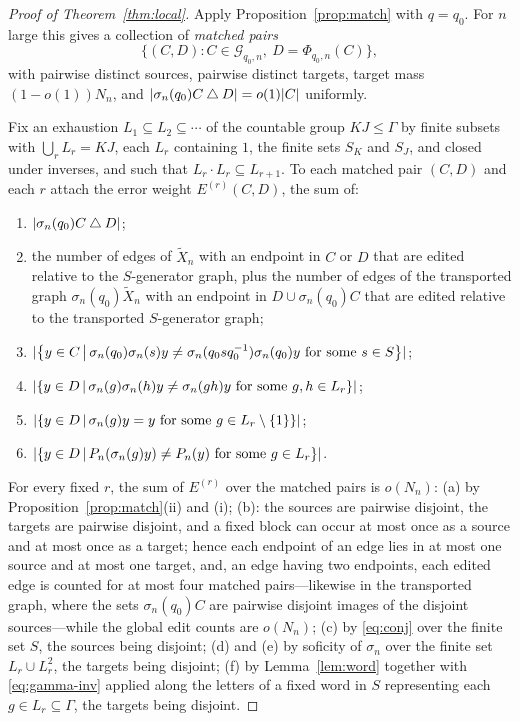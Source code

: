 \documentclass[11pt]{amsart}
\theoremstyle{definition}
\theoremstyle{plain}
\newcommand{\cG}{\mathcal G}
\DeclarePairedDelimiter{\abs}{\lvert}{\rvert}
\newcommand{\set}[1]{\left\{#1\right\}}
\newcommand{\suchthat}{\,\middle|\,}
\newcommand{\symdiff}{\mathbin{\triangle}}
\begin{document}
\begin{proof}[Proof of Theorem~\ref{thm:local}]
Apply Proposition~\ref{prop:match} with \(q=q_0\).  For \(n\) large this gives a collection of \emph{matched pairs}
\begin{equation}\label{eq:pairs}
 \bigl\{(C,D):C\in\cG_{q_0,n},\ D=\Phi_{q_0,n}(C)\bigr\},
\end{equation}
with pairwise distinct sources, pairwise distinct targets, target mass \((1-o(1))N_n\), and \(\abs{\sigma_n(q_0)C\symdiff D}=o(1)\abs C\) uniformly.

Fix an exhaustion \(L_1\subseteq L_2\subseteq\cdots\) of the countable group \(KJ\leq\Gamma\) by finite subsets with \(\bigcup_rL_r=KJ\), each \(L_r\) containing \(1\), the finite sets \(S_K\) and \(S_J\), and closed under inverses, and such that \(L_r\cdot L_r\subseteq L_{r+1}\).  To each matched pair \((C,D)\) and each \(r\) attach the error weight \(E^{(r)}(C,D)\), the sum of:
\begin{enumerate}[label=\textup{(\alph*)}]
\item \(\abs{\sigma_n(q_0)C\symdiff D}\);
\item the number of edges of \(\widetilde X_n\) with an endpoint in \(C\) or \(D\) that are edited relative to the \(S\)-generator graph, plus the number of edges of the transported graph \(\sigma_n(q_0)\widetilde X_n\) with an endpoint in \(D\cup\sigma_n(q_0)C\) that are edited relative to the transported \(S\)-generator graph;
\item \(\abs{\set{y\in C\suchthat\sigma_n(q_0)\sigma_n(s)y\ne\sigma_n(q_0sq_0^{-1})\sigma_n(q_0)y\text{ for some }s\in S}}\);
\item \(\abs{\set{y\in D\suchthat\sigma_n(g)\sigma_n(h)y\ne\sigma_n(gh)y\text{ for some }g,h\in L_r}}\);
\item \(\abs{\set{y\in D\suchthat\sigma_n(g)y=y\text{ for some }g\in L_r\setminus\{1\}}}\);
\item \(\abs{\set{y\in D\suchthat P_n(\sigma_n(g)y)\ne P_n(y)\text{ for some }g\in L_r}}\).
\end{enumerate}
For every fixed \(r\), the sum of \(E^{(r)}\) over the matched pairs is \(o(N_n)\): (a) by Proposition~\ref{prop:match}(ii) and (i); (b): the sources are pairwise disjoint, the targets are pairwise disjoint, and a fixed block can occur at most once as a source and at most once as a target; hence each endpoint of an edge lies in at most one source and at most one target, and, an edge having two endpoints, each edited edge is counted for at most four matched pairs---likewise in the transported graph, where the sets \(\sigma_n(q_0)C\) are pairwise disjoint images of the disjoint sources---while the global edit counts are \(o(N_n)\); (c) by \eqref{eq:conj} over the finite set \(S\), the sources being disjoint; (d) and (e) by soficity of \(\sigma_n\) over the finite set \(L_r\cup L_r^2\), the targets being disjoint; (f) by Lemma~\ref{lem:word} together with \eqref{eq:gamma-inv} applied along the letters of a fixed word in \(S\) representing each \(g\in L_r\subseteq\Gamma\), the targets being disjoint.


\end{proof}
\end{document}

